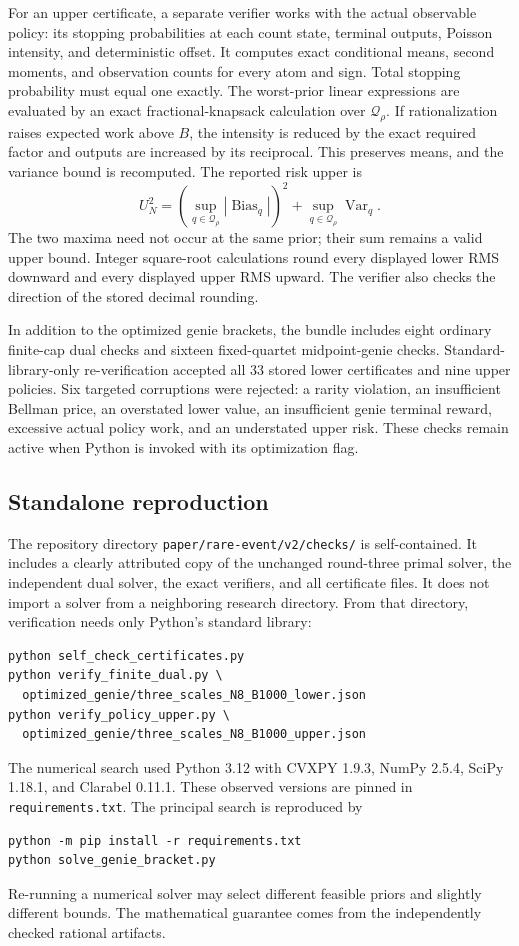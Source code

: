 For an upper certificate, a separate verifier works with the actual
observable policy: its stopping probabilities at each count state,
terminal outputs, Poisson intensity, and deterministic offset. It
computes exact conditional means, second moments, and observation
counts for every atom and sign. Total stopping probability must equal
one exactly. The worst-prior linear expressions are evaluated by an
exact fractional-knapsack calculation over $\mathcal Q_\rho$.
If rationalization raises expected work above $B$, the intensity is
reduced by the exact required factor and outputs are increased by its
reciprocal. This preserves means, and the variance bound is recomputed.
The reported risk upper is
\[
 U_N^2=
 \left(\sup_{q\in\mathcal Q_\rho}
                  |\operatorname{Bias}_q|\right)^2+
 \sup_{q\in\mathcal Q_\rho}\operatorname{Var}_q.
\]
The two maxima need not occur at the same prior; their sum remains a
valid upper bound. Integer square-root calculations round every
displayed lower RMS downward and every displayed upper RMS upward.
The verifier also checks the direction of the stored decimal rounding.

In addition to the optimized genie brackets, the bundle includes eight
ordinary finite-cap dual checks and sixteen fixed-quartet midpoint-genie
checks. Standard-library-only re-verification accepted all 33 stored
lower certificates and nine upper policies. Six targeted corruptions
were rejected: a rarity violation, an insufficient Bellman price, an
overstated lower value, an insufficient genie terminal reward, excessive
actual policy work, and an understated upper risk. These checks remain
active when Python is invoked with its optimization flag.

\subsection{Standalone reproduction}

The repository directory \nolinkurl{paper/rare-event/v2/checks/} is self-contained. It includes
a clearly attributed copy of the unchanged round-three primal solver,
the independent dual solver, the exact verifiers, and all certificate
files. It does not import a solver from a neighboring research directory.
From that directory, verification needs only Python's standard library:
\begin{verbatim}
python self_check_certificates.py
python verify_finite_dual.py \
  optimized_genie/three_scales_N8_B1000_lower.json
python verify_policy_upper.py \
  optimized_genie/three_scales_N8_B1000_upper.json
\end{verbatim}
The numerical search used Python 3.12 with CVXPY 1.9.3, NumPy 2.5.4,
SciPy 1.18.1, and Clarabel 0.11.1. These observed versions are pinned
in \texttt{requirements.txt}. The principal search is reproduced by
\begin{verbatim}
python -m pip install -r requirements.txt
python solve_genie_bracket.py
\end{verbatim}
Re-running a numerical solver may select different feasible priors
and slightly different bounds. The mathematical guarantee comes from
the independently checked rational artifacts.
